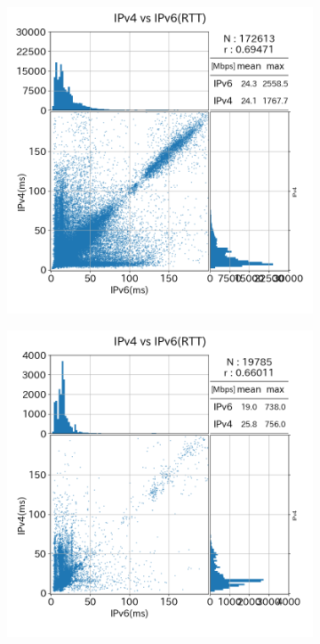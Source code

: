 \begin{figure}[htbp]
\begin{center}
\begin{subfigure}[b]{0.49\textwidth}
            \label{old_diffISP_rtt}
        \end{subfigure}
        \caption{{\bf 期間(1)}におけるRTT}
        \label{fig:old_isp_rtt}
    
        \begin{subfigure}[b]{0.49\textwidth}
            \centering
            \includegraphics[width=1.0\textwidth]{fig/new_sameISP_rtt.png}
            \label{new_sameISP_rtt}
        \end{subfigure}
        \begin{subfigure}[b]{0.49\textwidth}
            \centering
            \includegraphics[width=1.0\textwidth]{fig/new_diffISP_rtt.png}

\end{subfigure}
\end{center}
\end{figure}
